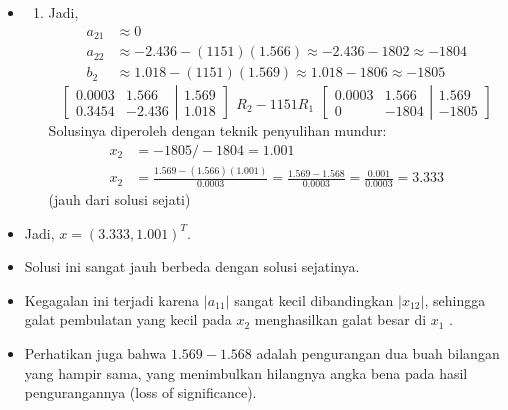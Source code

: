 \documentclass[pdflatex,compress,mathserif]{beamer}
\begin{document}
\begin{frame}
	\begin{itemize}
		\item[]
		\begin{enumerate}
			\item[] Jadi,
			\begin{align*}
				a_{21} &\approx 0 \\
				a_{22} &\approx -2.436 - (1151)(1.566) \approx -2.436 - 1802 \approx -1804 \\
				b_2 &\approx 1.018 - (1151)(1.569) \approx 1.018 - 1806 \approx -1805
			\end{align*}
			\[
			\left[
				\begin{matrix}
					0.0003 & 1.566 \\
					0.3454 & -2.436
				\end{matrix}
			\right|
			\left.
				\begin{matrix}
					1.569 \\ 1.018
				\end{matrix}
			\right]
			\begin{matrix}
				\\
				R_2 -1151R_1
			\end{matrix}
			\left[
				\begin{matrix}
					0.0003 & 1.566 \\
					0 & -1804
				\end{matrix}
			\right|
			\left.
				\begin{matrix}
					1.569 \\ -1805
				\end{matrix}
			\right]
			\]
			Solusinya diperoleh dengan teknik penyulihan mundur:
			\begin{align*}
				x_2 &= -1805/-1804 = 1.001 \\
				x_2 &= \frac{1.569 - ( 1.566 )( 1.001 )}{0.0003} = \frac{1.569 - 1.568}{0.0003} = \frac{0.001}{0.0003} = 3.333
			\end{align*}
			(jauh dari solusi sejati)
		\end{enumerate}
	\end{itemize}
\end{frame}

\begin{frame}
	\begin{itemize}
		\item Jadi, $ x = (3.333, 1.001)^T $.
		\item Solusi ini sangat jauh berbeda dengan solusi sejatinya.
		\item Kegagalan ini terjadi karena $ | a_{11} | $ sangat kecil dibandingkan $ |x_{12} | $, sehingga galat pembulatan yang kecil pada $ x_2 $ menghasilkan galat besar di $ x_1 $ .
		\item Perhatikan juga bahwa $ 1.569 - 1.568 $ adalah pengurangan dua buah bilangan yang hampir sama, yang menimbulkan hilangnya angka bena pada hasil pengurangannya (loss of significance).
	\end{itemize}
\end{frame}
\end{document}
